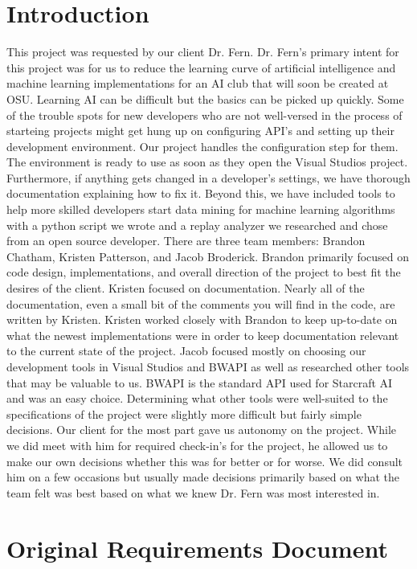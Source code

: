 \documentclass[10pt,letterpaper,onecolumn,draftclsnofoot]{IEEEtran}
\begin{document}
\section{Introduction}
	This project was requested by our client Dr. Fern. Dr. Fern's primary intent for this project was for us to reduce the learning curve of artificial intelligence and machine learning implementations for an AI club that will soon be created at OSU. Learning AI can be difficult but the basics can be picked up quickly. Some of the trouble spots for new developers who are not well-versed in the process of starteing projects might get hung up on configuring API's and setting up their development environment. Our project handles the configuration step for them. The environment is ready to use as soon as they open the Visual Studios project. Furthermore, if anything gets changed in a developer's settings, we have thorough documentation explaining how to fix it. Beyond this, we have included tools to help more skilled developers start data mining for machine learning algorithms with a python script we wrote and a replay analyzer we researched and chose from an open source developer. 
	There are three team members: Brandon Chatham, Kristen Patterson, and Jacob Broderick. Brandon primarily focused on code design, implementations, and overall direction of the project to best fit the desires of the client. Kristen focused on documentation. Nearly all of the documentation, even a small bit of the comments you will find in the code, are written by Kristen. Kristen worked closely with Brandon to keep up-to-date on what the newest implementations were in order to keep documentation relevant to the current state of the project. Jacob focused mostly on choosing our development tools in Visual Studios and BWAPI as well as researched other tools that may be valuable to us. BWAPI is the standard API used for Starcraft AI and was an easy choice. Determining what other tools were well-suited to the specifications of the project were slightly more difficult but fairly simple decisions. 
	Our client for the most part gave us autonomy on the project. While we did meet with him for required check-in's for the project, he allowed us to make our own decisions whether this was for better or for worse. We did consult him on a few occasions but usually made decisions primarily based on what the team felt was best based on what we knew Dr. Fern was most interested in.
\section{Original Requirements Document}

\end{document}
